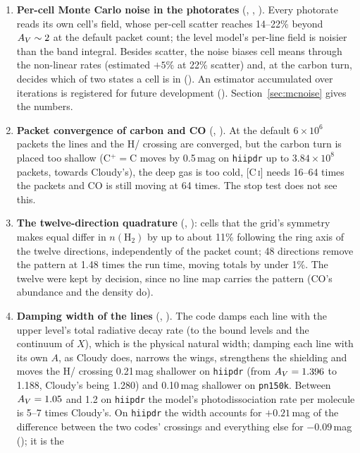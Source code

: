 \begin{enumerate}
\item \textbf{Per-cell Monte Carlo noise in the photorates} (,
  , ). Every photorate reads its own cell's field, whose
  per-cell scatter reaches 14--22\% beyond $A_{V}\sim2$ at the default packet
  count; the level model's per-line field is noisier than the band integral.
  Besides scatter, the noise biases cell means through the non-linear rates
  (estimated $+5\%$ at 22\% scatter) and, at the carbon turn, decides which of
  two states a cell is in (). An estimator accumulated over
  iterations is registered for future development ().
  Section~\ref{sec:mcnoise} gives the numbers.
\item \textbf{Packet convergence of carbon and CO} (, ).
  At the default $6\times10^6$ packets the \Htwo{} lines and the H/\Htwo{}
  crossing are converged, but the carbon turn is placed too shallow (C$^+=$C
  moves by 0.5\,mag on \texttt{hiipdr} up to $3.84\times10^8$ packets, towards
  Cloudy's), the deep gas is too cold, [C\,\textsc{i}] needs 16--64 times the
  packets and CO is still moving at 64 times. The stop test does not see this.
\item \textbf{The twelve-direction quadrature} (, ):
  cells that the grid's symmetry makes equal differ in $n(\mathrm{H_2})$ by up
  to about 11\% following the ring axis of the twelve directions, independently
  of the packet count; 48 directions remove the pattern at 1.48 times the run
  time, moving totals by under 1\%. The twelve were kept by decision, since no
  line map carries the pattern (CO's abundance and the \Htwo{} density do).
\item \textbf{Damping width of the \Htwo{} lines} (, ).
  The code damps each line with the upper level's total radiative decay rate
  (to the bound levels and the continuum of $X$), which is the physical natural
  width; damping each line
  with its own $A$, as Cloudy does, narrows the wings, strengthens the
  shielding and moves the H/\Htwo{} crossing 0.21\,mag shallower on \texttt{hiipdr}
  (from $A_{V}=1.396$ to 1.188, Cloudy's being 1.280) and 0.10\,mag shallower on
  \texttt{pn150k}. Between $A_{V}=1.05$ and 1.2 on \texttt{hiipdr} the model's
  photodissociation rate per molecule is 5--7 times Cloudy's. On \texttt{hiipdr}
  the width accounts for $+0.21$\,mag of the difference between the two codes'
  crossings and everything else for $-0.09$\,mag (); it is the

\end{enumerate}
